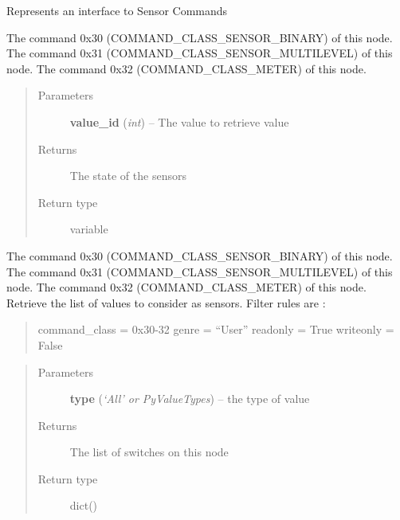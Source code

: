 \documentclass[letterpaper,10pt,english]{sphinxmanual}
\begin{document}
\begin{fulllineitems}
\label{command:openzwave.command.ZWaveNodeSensor}
Represents an interface to Sensor Commands

\begin{fulllineitems}
\label{command:openzwave.command.ZWaveNodeSensor.get_sensor_value}
The command 0x30 (COMMAND\_CLASS\_SENSOR\_BINARY) of this node.
The command 0x31 (COMMAND\_CLASS\_SENSOR\_MULTILEVEL) of this node.
The command 0x32 (COMMAND\_CLASS\_METER) of this node.
\begin{quote}\begin{description}
\item[{Parameters}] \leavevmode
\textbf{value\_id} (\emph{int}) -- The value to retrieve value

\item[{Returns}] \leavevmode
The state of the sensors

\item[{Return type}] \leavevmode
variable

\end{description}\end{quote}

\end{fulllineitems}


\begin{fulllineitems}
\label{command:openzwave.command.ZWaveNodeSensor.get_sensors}
The command 0x30 (COMMAND\_CLASS\_SENSOR\_BINARY) of this node.
The command 0x31 (COMMAND\_CLASS\_SENSOR\_MULTILEVEL) of this node.
The command 0x32 (COMMAND\_CLASS\_METER) of this node.
Retrieve the list of values to consider as sensors.
Filter rules are :
\begin{quote}

command\_class = 0x30-32
genre = ``User''
readonly = True
writeonly = False
\end{quote}
\begin{quote}\begin{description}
\item[{Parameters}] \leavevmode
\textbf{type} (\emph{`All' or PyValueTypes}) -- the type of value

\item[{Returns}] \leavevmode
The list of switches on this node

\item[{Return type}] \leavevmode
dict()

\end{description}\end{quote}

\end{fulllineitems}


\end{fulllineitems}
\end{document}
